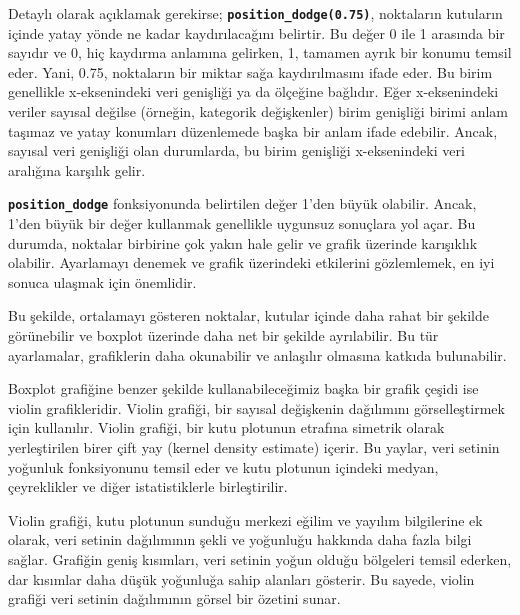 \documentclass[
  letterpaper,
  DIV=11,
  numbers=noendperiod]{scrreprt}
\begin{document}
Detaylı olarak açıklamak gerekirse;
\textbf{\texttt{position\_dodge(0.75)}}, noktaların kutuların içinde
yatay yönde ne kadar kaydırılacağını belirtir. Bu değer 0 ile 1 arasında
bir sayıdır ve 0, hiç kaydırma anlamına gelirken, 1, tamamen ayrık bir
konumu temsil eder. Yani, 0.75, noktaların bir miktar sağa
kaydırılmasını ifade eder. Bu birim genellikle x-eksenindeki veri
genişliği ya da ölçeğine bağlıdır. Eğer x-eksenindeki veriler sayısal
değilse (örneğin, kategorik değişkenler) birim genişliği birimi anlam
taşımaz ve yatay konumları düzenlemede başka bir anlam ifade edebilir.
Ancak, sayısal veri genişliği olan durumlarda, bu birim genişliği
x-eksenindeki veri aralığına karşılık gelir.

\begin{tcolorbox}[enhanced jigsaw, colback=white, coltitle=black, colbacktitle=quarto-callout-warning-color!10!white, opacitybacktitle=0.6, opacityback=0, toprule=.15mm, bottomrule=.15mm, bottomtitle=1mm, rightrule=.15mm, breakable, arc=.35mm, colframe=quarto-callout-warning-color-frame, titlerule=0mm, left=2mm, leftrule=.75mm, toptitle=1mm, title=\textcolor{quarto-callout-warning-color}{\faExclamationTriangle}\hspace{0.5em}{Dikkat}]

\textbf{\texttt{position\_dodge}} fonksiyonunda belirtilen değer 1'den
büyük olabilir. Ancak, 1'den büyük bir değer kullanmak genellikle
uygunsuz sonuçlara yol açar. Bu durumda, noktalar birbirine çok yakın
hale gelir ve grafik üzerinde karışıklık olabilir. Ayarlamayı denemek ve
grafik üzerindeki etkilerini gözlemlemek, en iyi sonuca ulaşmak için
önemlidir.

\end{tcolorbox}

Bu şekilde, ortalamayı gösteren noktalar, kutular içinde daha rahat bir
şekilde görünebilir ve boxplot üzerinde daha net bir şekilde
ayrılabilir. Bu tür ayarlamalar, grafiklerin daha okunabilir ve
anlaşılır olmasına katkıda bulunabilir.

Boxplot grafiğine benzer şekilde kullanabileceğimiz başka bir grafik
çeşidi ise violin grafikleridir. Violin grafiği, bir sayısal değişkenin
dağılımını görselleştirmek için kullanılır. Violin grafiği, bir kutu
plotunun etrafına simetrik olarak yerleştirilen birer çift yay (kernel
density estimate) içerir. Bu yaylar, veri setinin yoğunluk fonksiyonunu
temsil eder ve kutu plotunun içindeki medyan, çeyreklikler ve diğer
istatistiklerle birleştirilir.

Violin grafiği, kutu plotunun sunduğu merkezi eğilim ve yayılım
bilgilerine ek olarak, veri setinin dağılımının şekli ve yoğunluğu
hakkında daha fazla bilgi sağlar. Grafiğin geniş kısımları, veri setinin
yoğun olduğu bölgeleri temsil ederken, dar kısımlar daha düşük yoğunluğa
sahip alanları gösterir. Bu sayede, violin grafiği veri setinin
dağılımının görsel bir özetini sunar.
\end{document}
